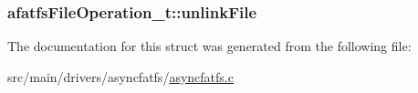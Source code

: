 \hypertarget{structafatfsFileOperation__t_a1d48c268fd6cd102284aa5a3df27b95a}{
\subsubsection[{unlink\+File}]{ afatfs\+File\+Operation\+\_\+t\+::unlink\+File}}\label{structafatfsFileOperation__t_a1d48c268fd6cd102284aa5a3df27b95a}


The documentation for this struct was generated from the following file\+:\begin{DoxyCompactItemize}
\item 
src/main/drivers/asyncfatfs/\hyperlink{asyncfatfs_8c}{asyncfatfs.\+c}\end{DoxyCompactItemize}

